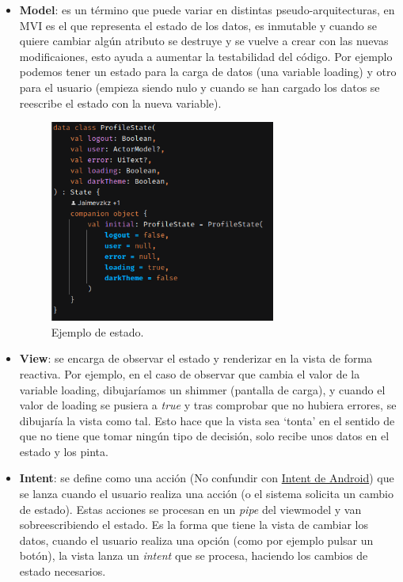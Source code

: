 \begin{itemize}
    \item \textbf{Model}: es un término que puede variar en distintas pseudo-arquitecturas, en MVI es el que representa el estado de los datos, es inmutable y cuando se quiere cambiar algún atributo se destruye y se vuelve a crear con las nuevas modificaiones, esto ayuda a aumentar la testabilidad del código. Por ejemplo podemos tener un estado para la carga de datos (una  variable loading) y otro para el usuario (empieza siendo nulo y cuando se han cargado los datos se reescribe el estado con la nueva variable).
    \begin{figure}[h]
        \centering
        \includegraphics[width = 0.7\textwidth]{Imagenes/Fuentes/ejemplo_estado.png}
        \caption{Ejemplo de estado.}
        \label{fig:ejemplo_estado}
    \end{figure}
    \item \textbf{View}: se encarga de observar el estado y renderizar en la vista de forma reactiva. Por ejemplo, en el caso de observar que cambia el valor de la variable loading, dibujaríamos un shimmer (pantalla de carga), y cuando el valor de loading se pusiera a \textit{true} y tras comprobar que no hubiera errores, se dibujaría la vista como tal. Esto hace que la vista sea ‘tonta’ en el sentido de que no tiene que tomar ningún tipo de decisión, solo recibe unos datos en el estado y los pinta.
    \item \textbf{Intent}: se define como una acción (No confundir con \href{https://developer.android.com/guide/components/intents-filters}{Intent de Android}) que se lanza cuando el usuario realiza una acción (o el sistema solicita un cambio de estado). Estas acciones se procesan en un \textit{pipe} del viewmodel y van sobreescribiendo el estado. Es la forma que tiene la vista de cambiar los datos, cuando el usuario realiza una opción (como por ejemplo pulsar un botón), la vista lanza un \textit{intent} que se procesa, haciendo los cambios de estado necesarios.

\end{itemize}
